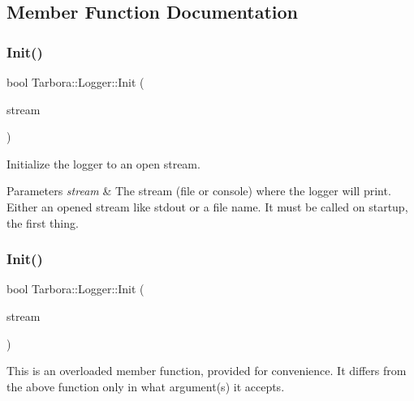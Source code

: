 \subsection{Member Function Documentation}
\mbox{\label{classTarbora_1_1Logger_abb526de5b2ecd2bda6ec4883de07bec8}} 
\subsubsection{\texorpdfstring{Init()}{Init()}\hspace{0.1cm}{\footnotesize\ttfamily [1/2]}}
{\footnotesize\ttfamily bool Tarbora\+::\+Logger\+::\+Init (\begin{DoxyParamCaption}\item[{F\+I\+LE $\ast$}]{stream }\end{DoxyParamCaption})\hspace{0.3cm}{\ttfamily [static]}}



Initialize the logger to an open stream. 


\begin{DoxyParams}{Parameters}
{\em stream} & The stream (file or console) where the logger will print. Either an opened stream like stdout or a file name. It must be called on startup, the first thing. \\
\hline
\end{DoxyParams}
\mbox{\label{classTarbora_1_1Logger_a7cc85fb1b154e17f6c7be073399160ac}} 
\subsubsection{\texorpdfstring{Init()}{Init()}\hspace{0.1cm}{\footnotesize\ttfamily [2/2]}}
{\footnotesize\ttfamily bool Tarbora\+::\+Logger\+::\+Init (\begin{DoxyParamCaption}\item[{std\+::string}]{stream }\end{DoxyParamCaption})\hspace{0.3cm}{\ttfamily [static]}}

This is an overloaded member function, provided for convenience. It differs from the above function only in what argument(s) it accepts. \mbox{\label{classTarbora_1_1Logger_aa32641fca455178d88f3b1c8b2f552ab}} 
